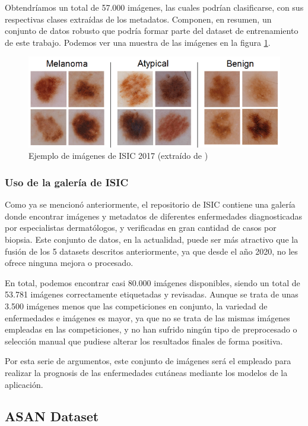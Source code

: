 Obtendríamos un total de 57.000 imágenes, las cuales podrían clasificarse, con sus respectivas clases extraídas de los metadatos. Componen, en resumen, un conjunto de datos robusto que podría formar parte del dataset de entrenamiento de este trabajo. Podemos ver una muestra de las imágenes en la figura \ref{fig:isicexampleimgs}.
\begin{figure}[H]
	\centering
	\includegraphics[scale = 0.5]{imagenes/Ejemplo2020.png}
	\caption{Ejemplo de imágenes de ISIC 2017 (extraído de \cite{codella2018skin})}
	\label{fig:isicexampleimgs}
\end{figure}

\subsubsection{Uso de la galería de ISIC}

Como ya se mencionó anteriormente, el repositorio de ISIC contiene una galería donde encontrar imágenes y metadatos de diferentes enfermedades diagnosticadas por especialistas dermatólogos, y verificadas en gran cantidad de casos por biopsia. Este conjunto de datos, en la actualidad, puede ser más atractivo que la fusión de los  5 datasets descritos anteriormente, ya que desde el año 2020, no les ofrece ninguna mejora o procesado.

En total, podemos encontrar casi 80.000 imágenes disponibles, siendo un total de 53.781 imágenes correctamente etiquetadas y revisadas. Aunque se trata de unas 3.500 imágenes menos que las competiciones en conjunto, la variedad de enfermedades e imágenes es mayor, ya que no se trata de las mismas imágenes empleadas en las competiciones, y no han sufrido ningún tipo de preprocesado o selección manual que pudiese alterar los resultados finales de forma positiva.

Por esta serie de argumentos, este conjunto de imágenes será el empleado para realizar la prognosis de las enfermedades cutáneas mediante los modelos de la aplicación.

\subsection{ASAN Dataset}

